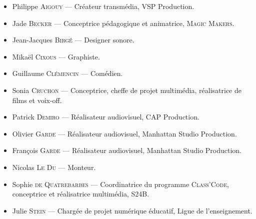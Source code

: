 {\small
\begin{itemize}\jazzitem
\item Philippe \textsc{Aigouy} --- Créateur transmédia, VSP Production.
\item Jade \textsc{Becker} --- Conceptrice pédagogique et animatrice, \textsc{Magic Makers}.
\item Jean-Jacques \textsc{Birgé} --- Designer sonore.
\item Mikaël \textsc{Cixous} --- Graphiste.
\item Guillaume \textsc{Clémencin} --- Comédien.
\item Sonia \textsc{Cruchon} --- Conceptrice, cheffe de projet multimédia, réalisatrice de films et voix-off.
\item Patrick \textsc{Demiro} --- Réalisateur audiovisuel, CAP Production.
\item Olivier \textsc{Garde} --- Réalisateur audiovisuel, Manhattan Studio Production.
\item François \textsc{Garde} --- Réalisateur audiovisuel, Manhattan Studio Production.
\item Nicolas \textsc{Le Du} --- Monteur.
\item Sophie \textsc{de Quatrebarbes} --- Coordinatrice du programme \textsc{Class’Code}, conceptrice et réalisatrice multimédia, S24B.
\item Julie \textsc{Stein} --- Chargée de projet numérique éducatif, Ligue de l'enseignement.
\end{itemize}}

